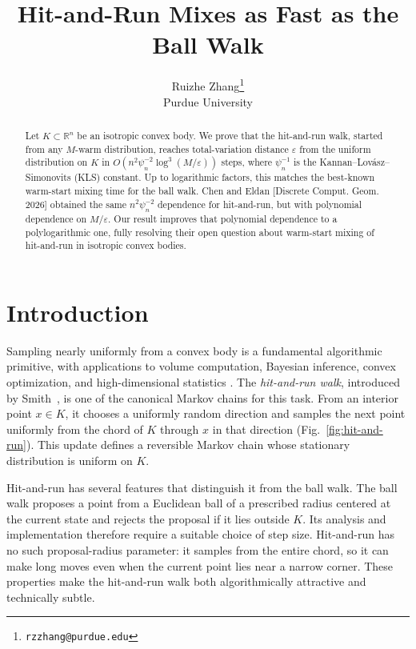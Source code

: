 \documentclass[11pt]{article}
\title{Hit-and-Run Mixes as Fast as the Ball Walk}
\author{Ruizhe Zhang\thanks{\texttt{rzzhang@purdue.edu}}\\Purdue University}
\date{}
\theoremstyle{definition}
\theoremstyle{remark}
\newcommand{\R}{\mathbb R}
\begin{document}
\maketitle

\begin{abstract}
Let $K\subset\R^n$ be an isotropic convex body.  We prove that the  hit-and-run walk, started from any $M$-warm distribution, reaches total-variation distance $\varepsilon$ from the uniform distribution on $K$ in $O\!\left(n^2\psi_n^{-2}\log^3(M/\varepsilon)\right)$ steps, where  $\psi_n^{-1}$ is the Kannan--Lov\'asz--Simonovits (KLS) constant.  Up to logarithmic factors, this matches the best-known warm-start mixing time for the ball walk.  Chen and Eldan [Discrete Comput. Geom. 2026] obtained the same $n^2\psi_n^{-2}$ dependence for hit-and-run, but with polynomial dependence on $M/\varepsilon$.  Our result improves that polynomial dependence to a polylogarithmic one, fully resolving their open question about warm-start mixing of hit-and-run in isotropic convex bodies.
\end{abstract}


\section{Introduction}\label{sec:introduction}
Sampling nearly uniformly from a convex body is a fundamental algorithmic
primitive, with applications to volume computation, Bayesian inference, convex optimization,
and high-dimensional statistics
\cite{DFK91,albert1993bayesian,KLS97,bertsimas2004solving,LV,kalai2006simulated,Holmes2006BayesianAV,CV18,JLLV26,KookVempalaDiffusion}.  The \emph{hit-and-run walk}, introduced by
Smith~\cite{Smith}, is one of the canonical Markov chains for this task. From an interior point $x\in K$, it chooses a uniformly random direction and samples the next point uniformly from the chord of $K$ through $x$ in that direction (Fig.~\ref{fig:hit-and-run}).  This update defines a reversible Markov chain whose stationary distribution is uniform on $K$.

Hit-and-run has several features that distinguish it from the ball walk.
The ball walk proposes a point from a Euclidean ball of a prescribed radius
centered at the current state and rejects the proposal if it lies outside
\(K\).  Its analysis and implementation therefore require a suitable choice
of step size.  Hit-and-run has no such proposal-radius parameter: it samples
from the entire chord, so it can make long moves even when the current
point lies near a narrow corner.  These properties make the hit-and-run walk both algorithmically attractive and technically subtle.
\end{document}
